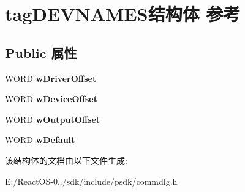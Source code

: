 \hypertarget{structtag_d_e_v_n_a_m_e_s}{}\section{tag\+D\+E\+V\+N\+A\+M\+E\+S结构体 参考}
\label{structtag_d_e_v_n_a_m_e_s}
\subsection*{Public 属性}
\begin{DoxyCompactItemize}
\item 
\mbox{\label{structtag_d_e_v_n_a_m_e_s_a43fd2f0b4d182a4b9c08c298e12ceca8}} 
W\+O\+RD {\bfseries w\+Driver\+Offset}
\item 
\mbox{\label{structtag_d_e_v_n_a_m_e_s_a1edb7c7e1ef7d3412255842a1d3c61f4}} 
W\+O\+RD {\bfseries w\+Device\+Offset}
\item 
\mbox{\label{structtag_d_e_v_n_a_m_e_s_ae311f59670a725280c05171c5697bd62}} 
W\+O\+RD {\bfseries w\+Output\+Offset}
\item 
\mbox{\label{structtag_d_e_v_n_a_m_e_s_a5c00d171546c5aab805fdada43b62495}} 
W\+O\+RD {\bfseries w\+Default}
\end{DoxyCompactItemize}


该结构体的文档由以下文件生成\+:\begin{DoxyCompactItemize}
\item 
E\+:/\+React\+O\+S-\/0../sdk/include/psdk/commdlg.\+h\end{DoxyCompactItemize}

